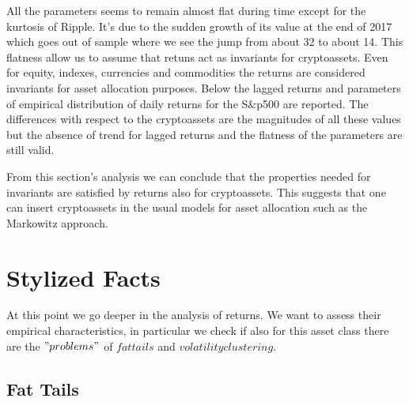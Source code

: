 All the parameters seems to remain almost flat during time except for the kurtosis of Ripple. It's due to the sudden growth of its value at the end of 2017 which goes out of sample where we see the jump from about 32 to about 14.
This flatness allow us to assume that retuns act as invariants for cryptoassets. Even for equity, indexes, currencies and commodities the returns are considered invariants for asset allocation purposes. Below the lagged returns and parameters of empirical distribution of daily returns for the S\&p500 are reported. The differences with respect to the cryptoassets are the magnitudes of all these values but the absence of trend for lagged returns and the flatness of the parameters are still valid.

\begin{table}[H]
    \centering
    \label{tab:distr_sp500}
\end{table}
\bigskip



From this section's analysis we can conclude that the properties needed for invariants are satisfied by returns also for cryptoassets. This suggests that one can insert cryptoassets in the usual models for asset allocation such as the Markowitz approach.

\section{Stylized Facts}
At this point we go deeper in the analysis of returns. We want to assess their empirical characteristics, in particular we check if also for this asset class there are the $"problems"$ of $fat tails$ and $volatility clustering$.

\subsection{Fat Tails}

